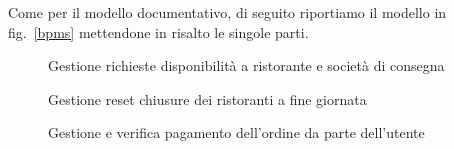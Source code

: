 \documentclass[11pt]{article} %
\begin{document}
Come per il modello documentativo, di seguito riportiamo il modello in fig.~\ref{bpms} mettendone in risalto le singole parti.

\begin{figure}[H]
\caption{Gestione richieste disponibilità a ristorante e società di consegna}
\end{figure}

\clearpage

\begin{figure}[H]
\centering
{}
\caption{Gestione reset chiusure dei ristoranti a fine giornata}
\end{figure}

\begin{figure}[H]
\centering
{}
\caption{Gestione e verifica pagamento dell'ordine da parte dell'utente}
\end{figure}
\end{document}

